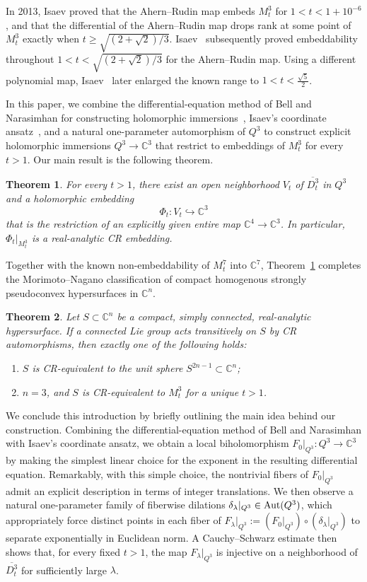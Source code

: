 \documentclass[11pt,a4paper,reqno]{amsart}
\newtheorem{theorem}{Theorem}[section]
\begin{document}
In 2013, Isaev \cite{Isaev2013} proved that the Ahern--Rudin map embeds $M_t^3$ for $1<t<1+10^{-6}$, and that the differential of the Ahern--Rudin map drops rank at some point of $M_t^3$ exactly when $t\geq\sqrt{(2+\sqrt2)/3}$. Isaev~\cite{Isaev2017} subsequently proved embeddability throughout $1<t<\sqrt{(2+\sqrt2)/3}$ for the Ahern--Rudin map. Using a different polynomial map, Isaev~\cite{Isaev2021} later enlarged the known range to $1<t<\frac{\sqrt5}{2}$.


In this paper, we combine the differential-equation method of Bell and Narasimhan for constructing holomorphic immersions~\cite{Bell}, Isaev's coordinate ansatz~\cite{Isaev2021}, and a natural one-parameter automorphism of \(Q^3\) to construct explicit holomorphic immersions \(Q^3\to\mathbb C^3\) that restrict to embeddings of \(M_t^3\) for every \(t>1\). Our main result is the following theorem.

\begin{theorem}\label{thm:main}
For every \(t>1\), there exist an open neighborhood \(V_t\) of
\(\overline{D_t^3}\) in \(Q^3\) and a holomorphic embedding
\[
\Phi_t:V_t\hookrightarrow\mathbb C^3
\]
that is the restriction of an explicitly given entire map
\(\mathbb C^4\to\mathbb C^3\). In particular,
\(\Phi_t|_{M_t^3}\) is a real-analytic CR embedding.
\end{theorem}


Together with the known non-embeddability of $M_t^7$ into
$\mathbb C^7$, Theorem~\ref{thm:main} completes the Morimoto--Nagano classification of compact homogenous strongly pseudoconvex hypersurfaces in $\mathbb C^n$. 
\begin{theorem}
Let $S\subset\mathbb C^n$ be a compact, simply connected, real-analytic hypersurface. If a connected Lie group acts transitively on $S$ by CR automorphisms, then exactly one of the following holds:
\begin{enumerate}
\item $S$ is CR-equivalent to the unit sphere
$S^{2n-1}\subset\mathbb C^n$;
\item $n=3$, and $S$ is CR-equivalent to $M_t^3$ for a unique $t>1$.
\end{enumerate}
\end{theorem}


We conclude this introduction by briefly outlining the main idea behind our construction. Combining the differential-equation method of Bell and Narasimhan with Isaev's coordinate ansatz, we obtain a local biholomorphism $F_0|_{Q^3}:Q^3\rightarrow\mathbb C^3$ by making the simplest linear choice for the exponent in the resulting differential equation. Remarkably, with this simple choice, the nontrivial fibers of $F_0|_{Q^3}$ admit an explicit description in terms of integer translations. We then observe a natural one-parameter family of fiberwise dilations $\delta_{\lambda}|_{Q^3}\in{\rm Aut}(Q^3)$, which appropriately force distinct points in each fiber of $F_{\lambda}|_{Q^3}:=(F_0|_{Q^3})\circ(\delta_{\lambda}|_{Q^3})$ to separate exponentially in Euclidean norm. A Cauchy--Schwarz estimate then shows that, for every fixed $t>1$, the map $F_{\lambda}|_{Q^3}$ is injective on a neighborhood of $\overline{D_t^3}$ for sufficiently large $\lambda$.
\bigskip
\end{document}
